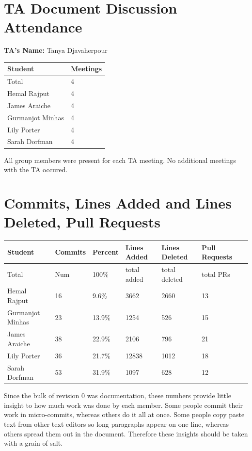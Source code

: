 \documentclass{article}
\begin{document}
\section{TA Document Discussion Attendance}

\noindent \textbf{TA's Name: } Tanya Djavaherpour

\begin{table}[H]
\centering
\begin{tabular}{ll}
\toprule
\textbf{Student} & \textbf{Meetings}\\
\midrule
Total & 4\\
Hemal Rajput & 4\\
James Araiche & 4\\
Gurmanjot Minhas & 4\\
Lily Porter & 4\\
Sarah Dorfman & 4\\
\bottomrule
\end{tabular}
\end{table}

All group members were present for each TA meeting. 
No additional meetings with the TA occured. 

\section{Commits, Lines Added and Lines Deleted, Pull Requests}

\begin{table}[H]
\centering
\begin{tabular}{lllllll}
\toprule
\textbf{Student} & \textbf{Commits} & \textbf{Percent} & \textbf{Lines Added} &
\textbf{Lines Deleted} & \textbf{Pull Requests}\\
\midrule
Total & Num & 100\% & total added & total deleted & total PRs\\
Hemal Rajput & 16 & 9.6\% & 3662 & 2660 & 13\\
Gurmanjot Minhas & 23 & 13.9\% & 1254 & 526 & 15\\
James Araiche & 38 & 22.9\% & 2106 & 796 & 21\\
Lily Porter & 36 & 21.7\% & 12838 & 1012 & 18\\
Sarah Dorfman & 53 & 31.9\% & 1097 & 628 & 12\\
\bottomrule
\end{tabular}
\end{table}

Since the bulk of revision 0 was documentation, these numbers provide
little insight to how much work was done by each member. Some people commit
their work in micro-commits, whereas others do it all at once. Some people copy
paste text from other text editors so long paragraphs appear on one line, whereas
others spread them out in the document. Therefore these insights should be taken 
with a grain of salt.  
\end{document}

